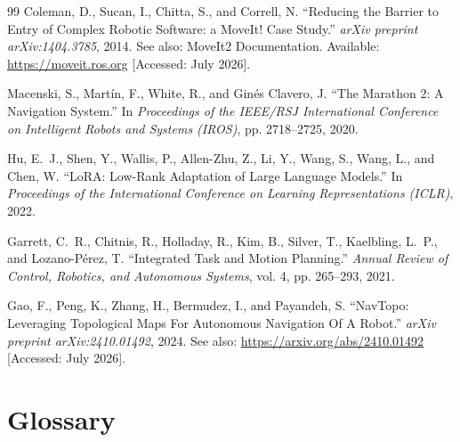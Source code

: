 \documentclass[12pt,a4paper]{article}
\begin{document}
\begin{thebibliography}{99}
Coleman, D., Sucan, I., Chitta, S., and Correll, N.
``Reducing the Barrier to Entry of Complex Robotic Software: a MoveIt! Case Study.''
\textit{arXiv preprint arXiv:1404.3785}, 2014.
See also: MoveIt2 Documentation. Available: \url{https://moveit.ros.org} [Accessed: July 2026].

Macenski, S., Mart\'{i}n, F., White, R., and Gin\'{e}s Clavero, J.
``The Marathon 2: A Navigation System.''
In \textit{Proceedings of the IEEE/RSJ International Conference on Intelligent Robots and Systems (IROS)}, pp. 2718--2725, 2020.

Hu, E.~J., Shen, Y., Wallis, P., Allen-Zhu, Z., Li, Y., Wang, S., Wang, L., and Chen, W.
``LoRA: Low-Rank Adaptation of Large Language Models.''
In \textit{Proceedings of the International Conference on Learning Representations (ICLR)}, 2022.

Garrett, C.~R., Chitnis, R., Holladay, R., Kim, B., Silver, T., Kaelbling, L.~P., and Lozano-P\'{e}rez, T.
``Integrated Task and Motion Planning.''
\textit{Annual Review of Control, Robotics, and Autonomous Systems}, vol. 4, pp. 265--293, 2021.

Gao, F., Peng, K., Zhang, H., Bermudez, I., and Payandeh, S.
``NavTopo: Leveraging Topological Maps For Autonomous Navigation Of A Robot.''
\textit{arXiv preprint arXiv:2410.01492}, 2024.
See also: \url{https://arxiv.org/abs/2410.01492} [Accessed: July 2026].

\end{thebibliography}

\newpage
\section*{Glossary}
\end{document}
